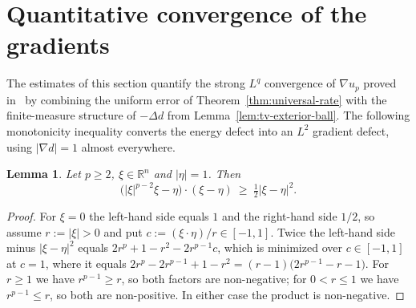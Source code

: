 \documentclass[11pt]{article}
\newcommand{\R}{\mathbb R}
\newcommand{\abs}[1]{\lvert #1\rvert}
\newtheorem{lemma}[theorem]{Lemma}
\theoremstyle{definition}
\theoremstyle{remark}
\begin{document}
\section{Quantitative convergence of the gradients}\label{sec:gradients}
The estimates of this section quantify the strong $L^q$ convergence of
$\nabla u_p$ proved in~\cite{BLR} by combining the uniform error of
Theorem~\ref{thm:universal-rate} with the finite-measure structure of
$-\Delta d$ from Lemma~\ref{lem:tv-exterior-ball}. The following monotonicity
inequality converts the energy defect into an $L^2$ gradient defect, using
$\abs{\nabla d}=1$ almost everywhere.
\begin{lemma}\label{lem:monotonicity}
Let $p\ge2$, $\xi\in\R^n$ and $\abs{\eta}=1$. Then
\begin{equation}\label{eq:monotonicity}
\bigl(\abs{\xi}^{p-2}\xi-\eta\bigr)\cdot(\xi-\eta)
\ \ge\ \tfrac12\abs{\xi-\eta}^{2}.
\end{equation}
\end{lemma}
\begin{proof}
For $\xi=0$ the left-hand side equals $1$ and the right-hand side $1/2$, so
assume $r:=\abs{\xi}>0$ and put $c:=(\xi\cdot\eta)/r\in[-1,1]$. Twice the
left-hand side minus $\abs{\xi-\eta}^2$ equals $2r^p+1-r^2-2r^{p-1}c$, which
is minimized over $c\in[-1,1]$ at $c=1$, where it equals
$2r^p-2r^{p-1}+1-r^2=(r-1)\bigl(2r^{p-1}-r-1\bigr)$. For $r\ge1$ we have
$r^{p-1}\ge r$, so both factors are non-negative; for $0<r\le1$ we have
$r^{p-1}\le r$, so both are non-positive. In either case the product is
non-negative.
\end{proof}
\end{document}
